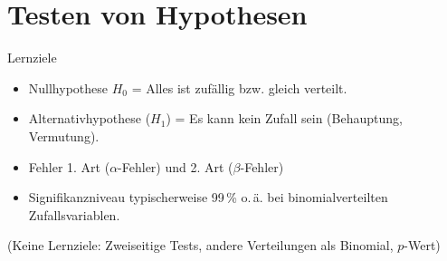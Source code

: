 
\section{Testen von Hypothesen}


Lernziele

\begin{itemize}
\item Nullhypothese $H_0$ = Alles ist zufällig bzw. gleich verteilt.

\item Alternativhypothese ($H_1$) = Es kann kein Zufall sein
  (Behauptung, Vermutung). 

\item Fehler 1. Art ($\alpha$-Fehler) und 2. Art ($\beta$-Fehler)
  
\item Signifikanzniveau typischerweise 99\,\%
  o.\,ä. bei binomialverteilten Zufallsvariablen.

\end{itemize}

(Keine Lernziele: Zweiseitige Tests, andere Verteilungen als Binomial,
$p$-Wert)

\newpage



%


